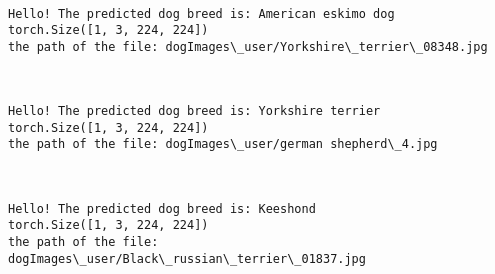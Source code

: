 \documentclass[11pt]{article}
\begin{document}
    \begin{center}
    \end{center}
    { \hspace*{\fill} \\}
    
    \begin{Verbatim}[commandchars=\\\{\}]
Hello! The predicted dog breed is: American eskimo dog
torch.Size([1, 3, 224, 224])
the path of the file: dogImages\_user/Yorkshire\_terrier\_08348.jpg

    \end{Verbatim}

    \begin{center}
    \end{center}
    { \hspace*{\fill} \\}
    
    \begin{Verbatim}[commandchars=\\\{\}]
Hello! The predicted dog breed is: Yorkshire terrier
torch.Size([1, 3, 224, 224])
the path of the file: dogImages\_user/german shepherd\_4.jpg

    \end{Verbatim}

    \begin{center}
    \end{center}
    { \hspace*{\fill} \\}
    
    \begin{Verbatim}[commandchars=\\\{\}]
Hello! The predicted dog breed is: Keeshond
torch.Size([1, 3, 224, 224])
the path of the file: dogImages\_user/Black\_russian\_terrier\_01837.jpg

    \end{Verbatim}

    \begin{center}
    \end{center}
    { \hspace*{\fill} \\}
    
\end{document}
